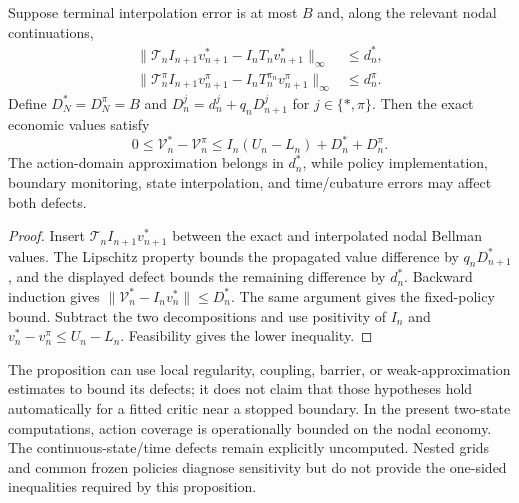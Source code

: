 \begin{proposition}
Suppose terminal interpolation error is at most $B$ and, along the relevant nodal continuations,
\begin{align*}
 \|\mathcal T_n I_{n+1}v_{n+1}^*-I_nT_nv_{n+1}^*\|_\infty&\leq d_n^*,\\
 \|\mathcal T_n^{\pi}I_{n+1}v_{n+1}^{\pi}-I_nT_n^{\pi_n}v_{n+1}^{\pi}\|_\infty&\leq d_n^{\pi}.
\end{align*}
Define $D_N^*=D_N^{\pi}=B$ and $D_n^j=d_n^j+q_nD_{n+1}^j$ for $j\in\{*,\pi\}$. Then the exact economic values satisfy
\[
 0\leq\mathcal V_n^*-\mathcal V_n^{\pi}
 \leq I_n(U_n-L_n)+D_n^*+D_n^{\pi}.
\]
The action-domain approximation belongs in $d_n^*$, while policy implementation, boundary monitoring, state interpolation, and time/cubature errors may affect both defects.
\end{proposition}
\begin{proof}
Insert $\mathcal T_n I_{n+1}v_{n+1}^*$ between the exact and interpolated nodal Bellman values. The Lipschitz property bounds the propagated value difference by $q_nD_{n+1}^*$, and the displayed defect bounds the remaining difference by $d_n^*$. Backward induction gives $\|\mathcal V_n^*-I_nv_n^*\|\leq D_n^*$. The same argument gives the fixed-policy bound. Subtract the two decompositions and use positivity of $I_n$ and $v_n^*-v_n^{\pi}\leq U_n-L_n$. Feasibility gives the lower inequality.
\end{proof}
The proposition can use local regularity, coupling, barrier, or weak-approximation estimates to bound its defects; it does not claim that those hypotheses hold automatically for a fitted critic near a stopped boundary. In the present two-state computations, action coverage is operationally bounded on the nodal economy. The continuous-state/time defects remain explicitly uncomputed. Nested grids and common frozen policies diagnose sensitivity but do not provide the one-sided inequalities required by this proposition.

